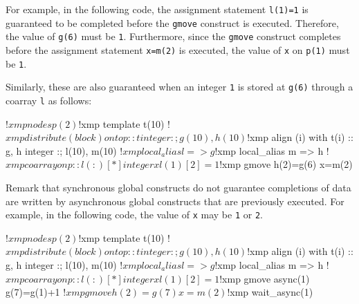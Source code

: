 For example, in the following code, the assignment statement \texttt{l(1)=1} is
guaranteed to be completed before the \texttt{gmove} construct is
executed.  Therefore, the value of \texttt{g(6)} must be \texttt{1}.
Furthermore, since the \texttt{gmove} construct completes before the
assignment statement \texttt{x=m(2)} is executed, the value of \texttt{x} on
\texttt{p(1)} must be \texttt{1}.
\begin{center}
\end{center}

Similarly, these are also guaranteed when an integer \texttt{1} is
stored at \texttt{g(6)} through a coarray \texttt{l} as follows:
\begin{center}
\begin{XFexample}
!$xmp nodes p(2)
!$xmp template t(10)
!$xmp distribute (block) onto p :: t
       integer :; g(10), h(10)
!$xmp align (i) with t(i) :: g, h
       integer :; l(10), m(10)
!$xmp local_alias l => g
!$xmp local_alias m => h
!$xmp coarray on p :: l(:)[*]
       integer x

l(1)[2]=1
!$xmp gmove
h(2)=g(6)
x=m(2)
\end{XFexample}
\end{center}

Remark that synchronous global constructs do not guarantee completions
of data are written by asynchronous global constructs that are
previously executed.  For example, in the following code, the value of
\texttt{x} may be \texttt{1} or \texttt{2}.

\begin{center}
\begin{XFexample}
!$xmp nodes p(2)
!$xmp template t(10)
!$xmp distribute (block) onto p :: t
       integer :; g(10), h(10)
!$xmp align (i) with t(i) :: g, h
       integer :; l(10), m(10)
!$xmp local_alias l => g
!$xmp local_alias m => h
!$xmp coarray on p :: l(:)[*]
       integer x

l(1)[2]=1
!$xmp gmove async(1)
g(7)=g(1)+1
!$xmp gmove
h(2)=g(7)
x=m(2)
!$xmp wait_async(1)
\end{XFexample}
\end{center}

